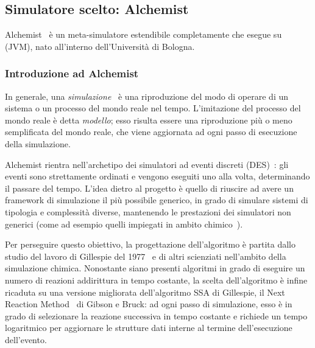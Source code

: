 \subsection{Simulatore scelto: Alchemist}\label{subsec:alchemist}
  Alchemist~\cite{alchemist-jos2013} è un meta-simulatore estendibile completamente  che esegue su  (JVM), nato all'interno dell'Università di Bologna.

  \subsubsection{Introduzione ad Alchemist}\label{subsec:introAlchemist}
    In generale, una \emph{simulazione}~\cite{des3} è una riproduzione del modo di operare di un sistema o un processo del mondo reale nel tempo.
    L'imitazione del processo del mondo reale è detta \emph{modello};
    esso risulta essere una riproduzione più o meno semplificata del mondo reale, che viene aggiornata ad ogni passo di esecuzione della simulazione.

    Alchemist rientra nell'archetipo dei simulatori ad eventi discreti (DES)~\cite{des, des2}:
    gli eventi sono strettamente ordinati e vengono eseguiti uno alla volta, determinando il passare del tempo.
    L'idea dietro al progetto è quello di riuscire ad avere un framework di simulazione il più possibile generico, in grado di simulare sistemi di tipologia e complessità diverse, mantenendo le prestazioni dei simulatori non generici (come ad esempio quelli impiegati in ambito chimico~\cite{gillespie1976}).

    Per perseguire questo obiettivo, la progettazione dell'algoritmo è partita dallo studio del lavoro di Gillespie del 1977~\cite{gillespie1977} e di altri scienziati nell'ambito della simulazione chimica.
    Nonostante siano presenti algoritmi in grado di eseguire un numero di reazioni addirittura in tempo costante, la scelta dell'algoritmo è infine ricaduta su una versione migliorata dell'algoritmo SSA di Gillespie, il Next Reaction Method~\cite{nextReactionMethod} di Gibson e Bruck:
    ad ogni passo di simulazione, esso è in grado di selezionare la reazione successiva in tempo costante e richiede un tempo logaritmico per aggiornare le strutture dati interne al termine dell'esecuzione dell'evento.

